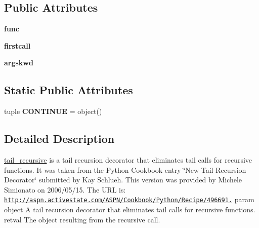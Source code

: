\subsection*{Public Attributes}
\begin{DoxyCompactItemize}
\item 
\hypertarget{classPyPedal_1_1pyp__newclasses_1_1tail__recursive_a5b35d5e4e129f021dd3de6ba93f1ecf9}{
{\bfseries func}}
\label{classPyPedal_1_1pyp__newclasses_1_1tail__recursive_a5b35d5e4e129f021dd3de6ba93f1ecf9}

\item 
\hypertarget{classPyPedal_1_1pyp__newclasses_1_1tail__recursive_a074f4fd764676b761d8c0b7d4045f6cb}{
{\bfseries firstcall}}
\label{classPyPedal_1_1pyp__newclasses_1_1tail__recursive_a074f4fd764676b761d8c0b7d4045f6cb}

\item 
\hypertarget{classPyPedal_1_1pyp__newclasses_1_1tail__recursive_a59e391fae3822a83031d819586208cf3}{
{\bfseries argskwd}}
\label{classPyPedal_1_1pyp__newclasses_1_1tail__recursive_a59e391fae3822a83031d819586208cf3}

\end{DoxyCompactItemize}
\subsection*{Static Public Attributes}
\begin{DoxyCompactItemize}
\item 
\hypertarget{classPyPedal_1_1pyp__newclasses_1_1tail__recursive_ac69a4e4a1e7969a1bf2b212e425e5e60}{
tuple {\bfseries CONTINUE} = object()}
\label{classPyPedal_1_1pyp__newclasses_1_1tail__recursive_ac69a4e4a1e7969a1bf2b212e425e5e60}

\end{DoxyCompactItemize}


\subsection{Detailed Description}
\hyperlink{classPyPedal_1_1pyp__newclasses_1_1tail__recursive}{tail\_\-recursive} is a tail recursion decorator that eliminates tail calls for recursive functions. It was taken from the Python Cookbook entry \char`\"{}New Tail Recursion Decorator\char`\"{} submitted by Kay Schlueh. This version was provided by Michele Simionato on 2006/05/15. The URL is: \href{http://aspn.activestate.com/ASPN/Cookbook/Python/Recipe/496691.}{\tt http://aspn.activestate.com/ASPN/Cookbook/Python/Recipe/496691.} param object A tail recursion decorator that eliminates tail calls for recursive functions. retval The object resulting from the recursive call. 

